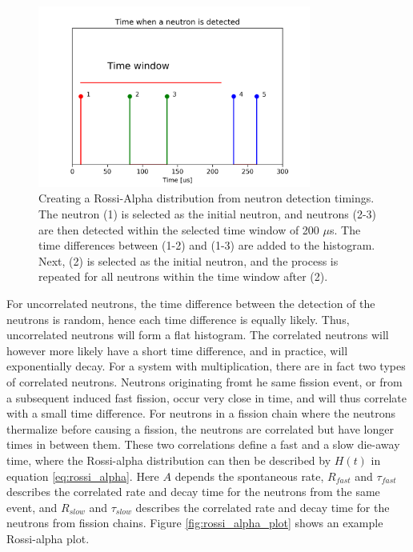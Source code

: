 \begin{figure} 
\centering
\includegraphics[width=0.8\textwidth]{figures/04-Neutron_timing.png}
\caption[Area Method]{\label{fig:neutron_timing}
Creating a Rossi-Alpha distribution from neutron detection timings. The neutron (1) is selected as the initial neutron, and neutrons (2-3) are then detected within the selected time window of 200 $\mu$s. The time differences between (1-2) and (1-3) are added to the histogram. Next, (2) is selected as the initial neutron, and the process is repeated for all neutrons within the time window after (2).}
\end{figure}

For uncorrelated neutrons, the time difference between the detection of the neutrons is random, hence each time difference is equally likely. Thus, uncorrelated neutrons will form a flat histogram. The correlated neutrons will however more likely have a short time difference, and in practice, will exponentially decay. For a system with multiplication, there are in fact two types of correlated neutrons. Neutrons originating fromt he same fission event, or from a subsequent induced fast fission, occur very close in time, and will thus correlate with a small time difference. For neutrons  in a fission chain where the neutrons thermalize before causing a fission, the neutrons are correlated but have longer times in between them. These two correlations define a fast and a slow die-away time, where the Rossi-alpha distribution can then be described by $H(t)$ in equation \ref{eq:rossi_alpha}. Here $A$ depends the spontaneous rate, $R_{fast}$ and $\tau_{fast}$ describes the correlated rate and decay time for the neutrons from the same event, and $R_{slow}$ and $\tau_{slow}$ describes the correlated rate and decay time for the neutrons from fission chains. Figure \ref{fig:rossi_alpha_plot} shows an example Rossi-alpha plot.  

